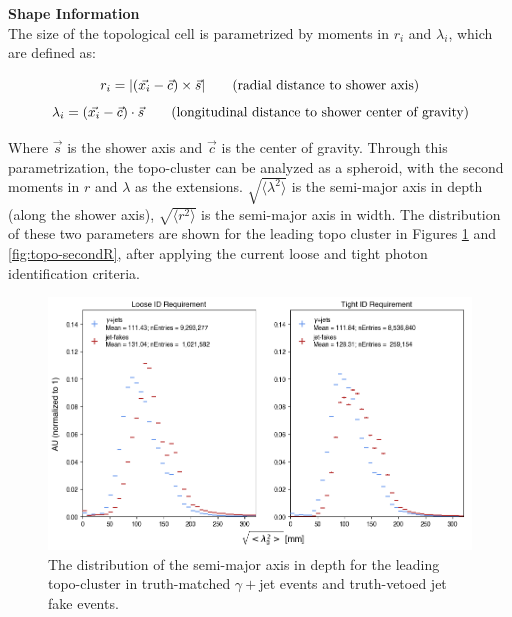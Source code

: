 \noindent\textbf{Shape Information}\\
\indent The size of the topological cell is parametrized by moments in $r_i$ and $\lambda_i$, which are defined as:

\begin{equation}
    r_i = |(\vec{x_i} - \vec{c}) \times \vec{s}| \text{\hspace{2em}(radial distance to shower axis)} \\
\end{equation}
\begin{equation}
    \lambda_i = (\vec{x_i} - \vec{c}) \cdot \vec{s} \text{\hspace{2em}(longitudinal distance to shower center of gravity)} 
\end{equation}

Where $\vec{s}$ is the shower axis and $\vec{c}$ is the center of gravity. Through this parametrization, the topo-cluster can be analyzed as a spheroid, with the second moments in $r$ and $\lambda$ as the extensions. $\sqrt{\langle \lambda^2 \rangle}$ is the semi-major axis in depth (along the shower axis), $\sqrt{\langle r^2 \rangle}$ is the semi-major axis in width. The distribution of these two parameters are shown for the leading topo cluster in Figures \ref{fig:topo-secondLambda} and \ref{fig:topo-secondR}, after applying the current loose and tight photon identification criteria.

\begin{figure}[!thp]
    \centering
    \includegraphics[width=.9\textwidth]{chapters/chapter4_photonID/images/hists/y_topoCluster0_secondLambda.png}
    \caption[The distribution of the semi-major axis in depth for the leading topo-cluster]{The distribution of the semi-major axis in depth for the leading topo-cluster in truth-matched $\gamma+$jet events and truth-vetoed jet fake events.}
    \label{fig:topo-secondLambda}

\end{figure}

